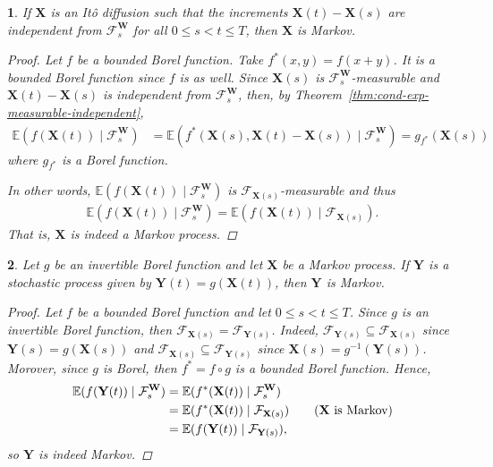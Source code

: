 \documentclass[english]{article}
\numberwithin{equation}{section}
\numberwithin{figure}{section}
\theoremstyle{bolddescit}
\newtheorem{theorem}{\protect\theoremname}[section]
\theoremstyle{definition}
\theoremstyle{definition}
\theoremstyle{plain}
\theoremstyle{plain}
\theoremstyle{bolddesc}
\theoremstyle{plain}
\theoremstyle{remark}
\providecommand{\theoremname}{Theorem}
\begin{document}
\begin{theorem}\label{thm:fp-ito-diffusion-markov}
  If $\mathbf{X}$ is an It\^o diffusion such that the increments $\mathbf{X}(t) - \mathbf{X}(s)$ are independent from $\mathcal{F}^\mathbf{W}_s$ for all $0 \le s < t \le T$, then $\mathbf{X}$ is Markov.

  \begin{proof}
    Let $f$ be a bounded Borel function. Take $f^*(x,y) = f(x+y)$. It is a bounded Borel function since $f$ is as well. Since $\mathbf{X}(s)$ is $\mathcal{F}^\mathbf{W}_s$-measurable and $\mathbf{X}(t) - \mathbf{X}(s)$ is independent from $\mathcal{F}^\mathbf{W}_s$, then, by Theorem~\ref{thm:cond-exp-measurable-independent},
    \begin{align*}
      \mathbb{E}(f(\mathbf{X}(t)) \mid \mathcal{F}^\mathbf{W}_s)
      &= \mathbb{E}(f^*(\mathbf{X}(s), \mathbf{X}(t) - \mathbf{X}(s)) \mid \mathcal{F}^\mathbf{W}_s)
      = g_{f^*}(\mathbf{X}(s))
    \end{align*}
    where $g_{f^*}$ is a Borel function.

    In other words, $\mathbb{E}(f(\mathbf{X}(t)) \mid \mathcal{F}^\mathbf{W}_s)$ is $\mathcal{F}_{\mathbf{X}(s)}$-measurable and thus
    \begin{align*}
      \mathbb{E}(f(\mathbf{X}(t)) \mid \mathcal{F}^\mathbf{W}_{s})
      = \mathbb{E}(f(\mathbf{X}(t)) \mid \mathcal{F}_{\mathbf{X}(s)}).
    \end{align*}
    That is, $\mathbf{X}$ is indeed a Markov process.
  \end{proof}
\end{theorem}

\begin{theorem}\label{thm:fp-markov-composing}
  Let $g$ be an invertible Borel function and let $\mathbf{X}$ be a Markov process. If $\mathbf{Y}$ is a stochastic process given by $\mathbf{Y}(t) = g(\mathbf{X}(t))$, then $\mathbf{Y}$ is Markov.

  \begin{proof}
    Let $f$ be a bounded Borel function and let $0 \le s < t \le T$. Since $g$ is an invertible Borel function, then $\mathcal{F}_{\mathbf{X}(s)} = \mathcal{F}_{\mathbf{Y}(s)}$. Indeed, $\mathcal{F}_{\mathbf{Y}(s)} \subseteq \mathcal{F}_{\mathbf{X}(s)}$ since $\mathbf{Y}(s) = g(\mathbf{X}(s))$ and $\mathcal{F}_{\mathbf{X}(s)} \subseteq \mathcal{F}_{\mathbf{Y}(s)}$ since $\mathbf{X}(s) = g^{-1}(\mathbf{Y}(s))$. Morover, since $g$ is Borel, then $f^* = f \circ g$ is a bounded Borel function. Hence,
    \begin{align*}
      \mathbb{E}(f(\mathbf{Y}(t)) \mid \mathcal{F}^\mathbf{W}_s)
      &= \mathbb{E}(f^*(\mathbf{X}(t)) \mid \mathcal{F}^\mathbf{W}_s)\\
      &= \mathbb{E}(f^*(\mathbf{X}(t)) \mid \mathcal{F}_{\mathbf{X}(s)}) \tag{$\mathbf{X}$ is Markov}\\
      &= \mathbb{E}(f(\mathbf{Y}(t)) \mid \mathcal{F}_{\mathbf{Y}(s)}),
    \end{align*}
    so $\mathbf{Y}$ is indeed Markov.
  \end{proof}
\end{theorem}
\end{document}
